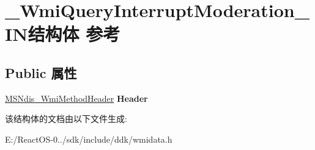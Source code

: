 \hypertarget{struct___wmi_query_interrupt_moderation___i_n}{}\section{\+\_\+\+Wmi\+Query\+Interrupt\+Moderation\+\_\+\+I\+N结构体 参考}
\label{struct___wmi_query_interrupt_moderation___i_n}
\subsection*{Public 属性}
\begin{DoxyCompactItemize}
\item 
\mbox{\label{struct___wmi_query_interrupt_moderation___i_n_a283634787a23aadeecae44753aaf6555}} 
\hyperlink{struct___m_s_ndis___wmi_method_header}{M\+S\+Ndis\+\_\+\+Wmi\+Method\+Header} {\bfseries Header}
\end{DoxyCompactItemize}


该结构体的文档由以下文件生成\+:\begin{DoxyCompactItemize}
\item 
E\+:/\+React\+O\+S-\/0../sdk/include/ddk/wmidata.\+h\end{DoxyCompactItemize}

